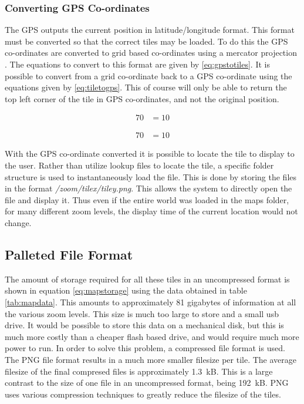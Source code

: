 
\subsubsection{Converting GPS Co-ordinates}

The GPS outputs the current position in latitude/longitude format. This format must be converted so that the correct tiles may be loaded. To do this the GPS co-ordinates are converted to grid based co-ordinates using a mercator projection \cite{slippy_map_tilenames}. The equations to convert to this format are given by \ref{eq:gpstotiles}. It is possible to convert from a grid co-ordinate back to a GPS co-ordinate using the equations given by \ref{eq:tiletogps}. This of course will only be able to return the top left corner of the tile in GPS co-ordinates, and not the original position.

\begin{align}
\label{eq:gpstotiles}
70&=10
\end{align}

\begin{align}
\label{eq:tilestogps}
70&=10
\end{align}

With the GPS co-ordinate converted it is possible to locate the tile to display to the user. Rather than utilize lookup files to locate the tile, a specific folder structure is used to instantaneously load the file. This is done by storing the files in the format \emph{/zoom/tilex/tiley.png}. This allows the system to directly open the file and display it. Thus even if the entire world was loaded in the maps folder, for many different zoom levels, the display time of the current location would not change.

\subsection{Palleted File Format}

The amount of storage required for all these tiles in an uncompressed format is shown in equation \ref{eq:mapstorage} using the data obtained in table \ref{tab:mapdata}. This amounts to approximately 81 gigabytes of information at all the various zoom levels. This size is much too large to store and a small usb drive. It would be possible to store this data on a mechanical disk, but this is much more costly than a cheaper flash based drive, and would require much more power to run.
In order to solve this problem, a compressed file format is used. The PNG file format results in a much more smaller filesize per tile. The average filesize of the final compresed files is approximately 1.3~kB. This is a large contrast to the size of one file in an uncompressed format, being 192~kB. PNG uses various compression techniques to greatly reduce the filesize of the tiles.

